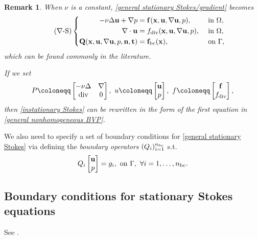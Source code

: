 \documentclass[oneside,11pt]{book}
\numberwithin{equation}{section}
\newtheorem{remark}{Remark}[section]
\begin{document}
\begin{remark}
    When $\nu$ is a constant, \eqref{general stationary Stokes/gradient} becomes
    \begin{equation}
        \label{stationary Stokes/gradient}
        \tag{$\nabla$-S}
        \left\{\begin{split}
            -\nu\Delta{\bf u} + \nabla p &= {\bf f}({\bf x},{\bf u},\nabla{\bf u},p),&&\mbox{ in }\Omega,\\
            \nabla\cdot{\bf u} &= f_{\rm div}({\bf x},{\bf u},\nabla{\bf u},p),&&\mbox{ in }\Omega,\\
            {\bf Q}({\bf x},{\bf u},\nabla{\bf u},p,{\bf n},{\bf t}) &= {\bf f}_{\rm bc}({\bf x}),&&\mbox{ on }\Gamma,
        \end{split}\right.
    \end{equation}
    which can be found commonly in the literature.
    
    If we set
    \begin{align*}
        P\coloneqq\begin{bmatrix}
            -\nu\Delta & \nabla\\ \operatorname{div} & 0
        \end{bmatrix},\ u\coloneqq\begin{bmatrix}
            {\bf u}\\ p
        \end{bmatrix},\ f\coloneqq\begin{bmatrix}
            {\bf f}\\ f_{\rm div}
        \end{bmatrix},
    \end{align*}
    then \eqref{instationary Stokes} can be rewritten in the form of the first equation in \eqref{general nonhomogeneous BVP}.
\end{remark}
We also need to specify a set of boundary conditions for \eqref{general stationary Stokes} via defining the \textit{boundary operators} $(Q_i)_{i=1}^{n_{\rm bc}}$ s.t.
\begin{align*}
    Q_i\begin{bmatrix}
        {\bf u}\\ p
    \end{bmatrix} = g_i,\mbox{ on }\Gamma,\ \forall i = 1,\ldots,n_{\rm bc}.
\end{align*}

\subsection{Boundary conditions for stationary Stokes equations}
See \cite[Chap. 4]{John2016}.
\end{document}
